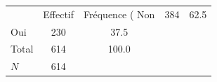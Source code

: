 {
\def\sym#1{\ifmmode^{#1}\else\(^{#1}\)\fi}
\begin{tabular}{l*{1}{cc}}
\toprule
            &    Effectif&Fréquence (%
\midrule
Non         &         384&        62.5\\
Oui         &         230&        37.5\\
Total       &         614&       100.0\\
\midrule
\(N\)       &         614&            \\
\bottomrule
\end{tabular}
}
